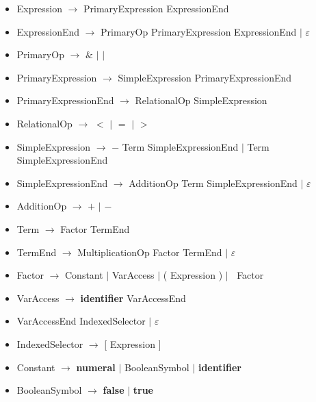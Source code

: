 \documentclass{article}
\let\bf\textbf
\newcommand{\der}{$\longrightarrow$ }
\newcommand{\es}{$\varepsilon$ }
\newcommand{\alt}{\Large$|$ \normalsize }
\begin{document}
\begin{itemize}[label={}]
    \item Expression \der PrimaryExpression ExpressionEnd
    \item ExpressionEnd \der PrimaryOp PrimaryExpression ExpressionEnd \alt \es
    \item PrimaryOp \der $\&$ \alt $|$
    \item PrimaryExpression \der SimpleExpression PrimaryExpressionEnd
    \item PrimaryExpressionEnd \der RelationalOp SimpleExpression
    \item RelationalOp \der $<$ \alt $=$ \alt $>$
    \item SimpleExpression \der $-$ Term SimpleExpressionEnd \alt Term SimpleExpressionEnd
    \item SimpleExpressionEnd \der AdditionOp Term SimpleExpressionEnd \alt \es
    \item AdditionOp \der $+$ \alt $-$
    \item Term \der Factor TermEnd
    \item TermEnd \der MultiplicationOp Factor TermEnd \alt \es
    \item Factor \der Constant \alt VarAccess \alt ( Expression ) \alt $~$ Factor
    \item VarAccess \der \bf{identifier} VarAccessEnd 
    \item VarAccessEnd IndexedSelector \alt \es
    \item IndexedSelector \der [ Expression ]
    \item Constant \der \bf{numeral} \alt BooleanSymbol \alt \bf{identifier}
    \item BooleanSymbol \der \bf{false} \alt \bf{true}
\end{itemize}
\end{document}
